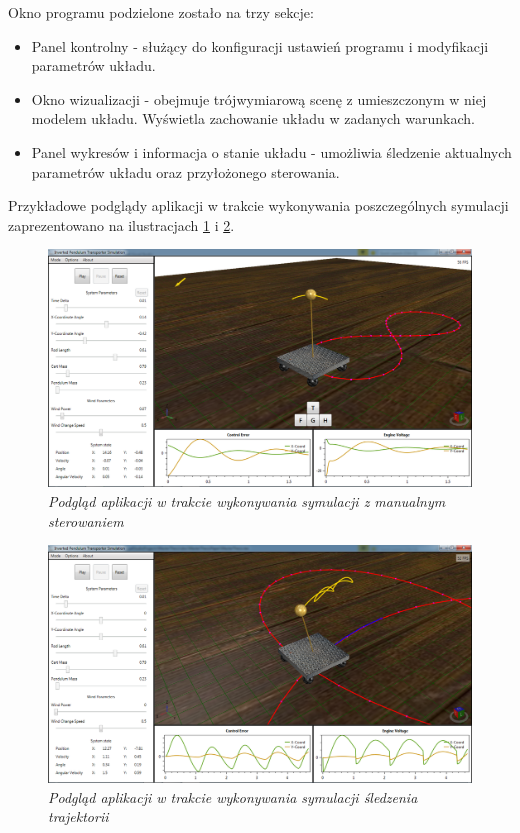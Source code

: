 \documentclass[12pt, twoside, openany]{report}
\theoremstyle{definition}
\begin{document}
Okno programu podzielone zostało na trzy sekcje:
\begin{itemize}
\item Panel kontrolny - służący do konfiguracji ustawień programu i modyfikacji parametrów układu.
\item Okno wizualizacji - obejmuje trójwymiarową scenę z umieszczonym w niej modelem układu. Wyświetla zachowanie układu w zadanych warunkach.
\item Panel wykresów i informacja o stanie układu - umożliwia śledzenie aktualnych parametrów układu oraz przyłożonego sterowania.
\end{itemize}

Przykładowe podglądy aplikacji w trakcie wykonywania poszczególnych symulacji zaprezentowano na ilustracjach \ref{Application} i \ref{Simulation}.

\begin{figure}[H]
	\centering
		\includegraphics[width = 400pt]{Application} 
		\caption{\textit{Podgląd aplikacji w trakcie wykonywania symulacji z manualnym sterowaniem}}
		\label{Application}
\end{figure}

\begin{figure}[H]
	\centering
		\includegraphics[width = 400pt]{Simulation} 
		\caption{\textit{Podgląd aplikacji w trakcie wykonywania symulacji śledzenia trajektorii}}
		\label{Simulation}
\end{figure}
\end{document}

